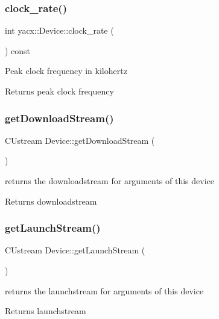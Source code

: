 \subsubsection{\texorpdfstring{clock\+\_\+rate()}{clock\_rate()}}
{\footnotesize\ttfamily int yacx\+::\+Device\+::clock\+\_\+rate (\begin{DoxyParamCaption}{ }\end{DoxyParamCaption}) const\hspace{0.3cm}{\ttfamily [inline]}}

Peak clock frequency in kilohertz \begin{DoxyReturn}{Returns}
peak clock frequency 
\end{DoxyReturn}
\mbox{\label{classyacx_1_1_device_a5304b1ba9e1fc512caa64041b39f13fd}} 
\subsubsection{\texorpdfstring{get\+Download\+Stream()}{getDownloadStream()}}
{\footnotesize\ttfamily C\+Ustream Device\+::get\+Download\+Stream (\begin{DoxyParamCaption}{ }\end{DoxyParamCaption})}

returns the downloadstream for arguments of this device \begin{DoxyReturn}{Returns}
downloadstream 
\end{DoxyReturn}
\mbox{\label{classyacx_1_1_device_a51d568a0c576533dab7a3d2bbe5c2214}} 
\subsubsection{\texorpdfstring{get\+Launch\+Stream()}{getLaunchStream()}}
{\footnotesize\ttfamily C\+Ustream Device\+::get\+Launch\+Stream (\begin{DoxyParamCaption}{ }\end{DoxyParamCaption})}

returns the launchstream for arguments of this device \begin{DoxyReturn}{Returns}
launchstream 
\end{DoxyReturn}
\mbox{\label{classyacx_1_1_device_a9227417e61e545bed24aeb72272bf277}} 
